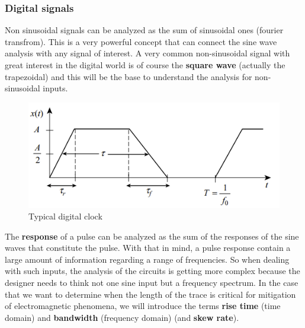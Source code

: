 \documentclass[final]{cubedoc}
\begin{document}
	
	\subsubsection{Digital signals}
	
	Non sinusoidal signals can be analyzed as the sum of sinusoidal ones (fourier transfrom). This is a very powerful concept that can connect the sine wave analysis with any signal of interest. A very common non-sinusoidal signal with great interest in the digital world is of course the \textbf{square wave} (actually the trapezoidal) and this will be the base to understand the analysis for non-sinusoidal inputs.
	
	\begin{figure}[h!]
		\centering
		\includegraphics[keepaspectratio, width = \textwidth]{assets/clock_signal.png}
		\caption{Typical digital clock \cite[p.2]{paul2011transmission}}
	\end{figure}
	
	
	The \textbf{response} of a pulse can be analyzed as the sum of the responses of the sine waves that constitute the pulse. With that in mind, a pulse response contain a large amount of information regarding a range of frequencies. So when dealing with such inputs, the analysis of the circuits is getting more complex because the designer needs to think not one sine input but a frequency spectrum. In the case that we want to determine when the length of the trace is critical for mitigation of electromagnetic phenomena, we will introduce the terms \textbf{rise time} (time domain) and \textbf{bandwidth} (frequency domain) (and \textbf{skew rate}).
	
\end{document}
